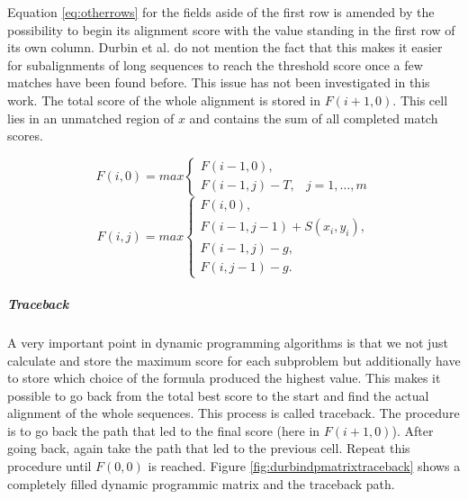 Equation \ref{eq:otherrows} for the fields aside of the first row is amended by the possibility to begin its alignment score with the value standing in the first row of its own column.
Durbin et al. do not mention the fact that this makes it easier for subalignments of long sequences to reach the threshold score once a few matches have been found before.
This issue has not been investigated in this work.
The total score of the whole alignment is stored in $F(i+1,0)$. This cell lies in an unmatched region of $x$ and contains the sum of all completed match scores.


\begin{equation}
F(i,0) = max \left\{ \begin{array}{lr}F(i-1,0),&\\F(i-1,j)-T,& j=1,\dots,m\end{array}\right.
\label{eq:firstrow}
\end{equation}
\begin{equation}
F(i,j) = max \left\{ \begin{array}{lr}F(i,0),\\F(i-1,j-1)+S(x_i,y_i),\\F(i-1,j)-g,\\F(i,j-1)-g.\end{array}\right.
\label{eq:otherrows}
\end{equation}

\subparagraph{Traceback}
A very important point in dynamic programming algorithms is that we not just calculate and store the maximum score for each subproblem but additionally have to store which choice of the formula produced the highest value.
This makes it possible to go back from the total best score to the start and find the actual alignment of the whole sequences.
This process is called traceback.
The procedure is to go back the path that led to the final score (here in $F(i+1,0)$).
After going back, again take the path that led to the previous cell. Repeat this procedure until $F(0,0)$ is reached.
Figure \ref{fig:durbindpmatrixtraceback} shows a completely filled dynamic programmic matrix and the traceback path.

